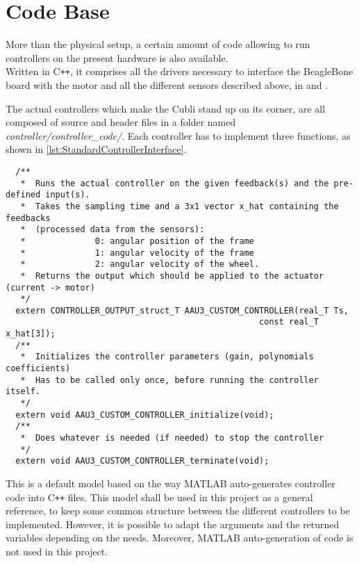 \section{Code Base}\label{sec:codeBase}
More than the physical setup, a certain amount of code allowing to run controllers on the present hardware is also available. \\
Written in C\texttt{++}, it comprises all the drivers necessary to interface the BeagleBone board with the motor and all the different sensors described above, in  and .

The actual controllers which make the Cubli stand up on its corner, are all composed of source and header files in a folder named \textit{controller/controller\_code/}. Each controller has to implement three functions, as shown in \autoref{lst:StandardControllerInterface}.
%
\begin{lstlisting}
  /**
   *  Runs the actual controller on the given feedback(s) and the pre-defined input(s).
   *  Takes the sampling time and a 3x1 vector x_hat containing the feedbacks 
   *  (processed data from the sensors):
   *              0: angular position of the frame
   *              1: angular velocity of the frame
   *              2: angular velocity of the wheel.
   *  Returns the output which should be applied to the actuator (current -> motor)
   */
  extern CONTROLLER_OUTPUT_struct_T AAU3_CUSTOM_CONTROLLER(real_T Ts, 
                                                   const real_T x_hat[3]);
  /**
   *  Initializes the controller parameters (gain, polynomials coefficients)
   *  Has to be called only once, before running the controller itself.
   */
  extern void AAU3_CUSTOM_CONTROLLER_initialize(void);
  /**
   *  Does whatever is needed (if needed) to stop the controller
   */
  extern void AAU3_CUSTOM_CONTROLLER_terminate(void);

\end{lstlisting}
This is a default model based on the way MATLAB auto-generates controller code into C\texttt{++} files. This model shall be used in this project as a general reference, to keep some common structure between the different controllers to be implemented. However, it is possible to adapt the arguments and the returned variables depending on the needs. Moreover, MATLAB auto-generation of code is not used in this project.


